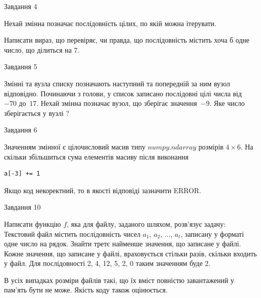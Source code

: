 \documentclass[12pt, ukrainian]{article}
\begin{document}
{               
{\begin{center}Завдання {4}\end{center}}
\vspace{-6mm}
Нехай змінна  позначає послідовність цілих, по якій можна ітерувати.

Написати вираз, що перевіряє, чи правда, що послідовність  містить хоча б одне число, що ділиться на 7.\par

\vspace{10mm}
               
{\begin{center}Завдання {5}\end{center}}
\vspace{-6mm}
Змінні  та  вузла списку позначають наступний та попередній за ним вузол відповідно. Починаючи з голови, у список записано послідовні цілі числа від~$-70$ до~$17$. Нехай змінна  позначає вузол, що зберігає значення~$-9$.
Яке число зберігається у вузлі  ?\par

               
{\begin{center}Завдання {6}\end{center}}
\vspace{-6mm}
Значенням змінної  є цілочисловий масив типу $numpy.ndarray$ розмірів $4{\times}6$. На скільки збільшиться сума елементів масиву  після виконання
\begin{verbatim}
a[-3] += 1
\end{verbatim}


Якщо код некоректний, то в якості відповіді зазначити ERROR.\par

               
{\begin{center}Завдання {10}\end{center}}
\vspace{-6mm}

Написати функцію $f$, яка для файлу, заданого шляхом, розв’язує задачу:\\ Текстовий файл містить послідовність чисел $a_1$, $a_2$, $\ldots$, $a_t$, записану у форматі одне число на рядок. Знайти третє найменше значення, що записане у файлі. Кожне значення, що записане у файлі, враховується стільки разів, скільки входить у файл. Для послідовності 2, 4, 12, 5, 2, 0 таким значенням буде 2.

В усіх випадках розміри файлів такі, що їх вміст повністю завантажений у пам'ять бути не може. Якість коду також оцінюється.



}
\end{document}
